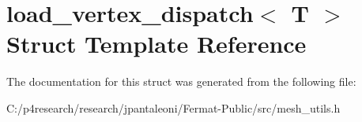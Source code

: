 \hypertarget{structload__vertex__dispatch}{}\section{load\+\_\+vertex\+\_\+dispatch$<$ T $>$ Struct Template Reference}
\label{structload__vertex__dispatch}


The documentation for this struct was generated from the following file\+:\begin{DoxyCompactItemize}
\item 
C\+:/p4research/research/jpantaleoni/\+Fermat-\/\+Public/src/mesh\+\_\+utils.\+h\end{DoxyCompactItemize}
